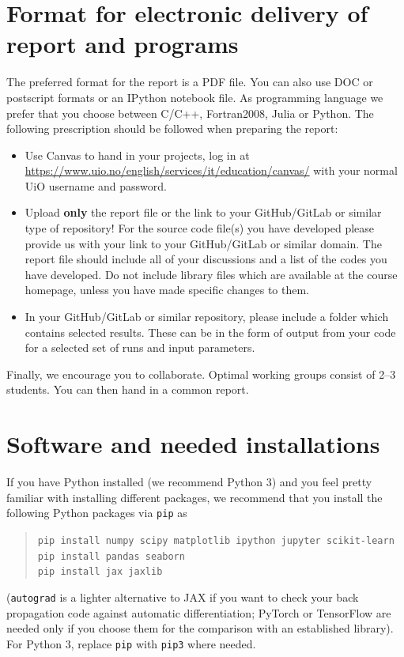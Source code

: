 \documentclass[11pt,a4paper]{article}
\begin{document}
\section*{Format for electronic delivery of report and programs}

The preferred format for the report is a PDF file.  You can also use DOC or
postscript formats or an IPython notebook file.  As programming language we
prefer that you choose between C/C++, Fortran2008, Julia or Python.  The
following prescription should be followed when preparing the report:
\begin{itemize}[nosep]
  \item Use Canvas to hand in your projects, log in at
        \url{https://www.uio.no/english/services/it/education/canvas/} with
        your normal UiO username and password.
  \item Upload \textbf{only} the report file or the link to your GitHub/GitLab
        or similar type of repository!  For the source code file(s) you have
        developed please provide us with your link to your GitHub/GitLab or
        similar domain.  The report file should include all of your
        discussions and a list of the codes you have developed.  Do not
        include library files which are available at the course homepage,
        unless you have made specific changes to them.
  \item In your GitHub/GitLab or similar repository, please include a folder
        which contains selected results.  These can be in the form of output
        from your code for a selected set of runs and input parameters.
\end{itemize}
Finally, we encourage you to collaborate.  Optimal working groups consist of
2--3 students.  You can then hand in a common report.

\section*{Software and needed installations}

If you have Python installed (we recommend Python 3) and you feel pretty
familiar with installing different packages, we recommend that you install
the following Python packages via \texttt{pip} as
\begin{quote}\small
\texttt{pip install numpy scipy matplotlib ipython jupyter scikit-learn}\\
\texttt{pip install pandas seaborn}\\
\texttt{pip install jax jaxlib}
\end{quote}
(\texttt{autograd} is a lighter alternative to JAX if you want to check your
back propagation code against automatic differentiation; PyTorch or
TensorFlow are needed only if you choose them for the comparison with an
established library).  For Python 3, replace \texttt{pip} with
\texttt{pip3} where needed.
\end{document}

